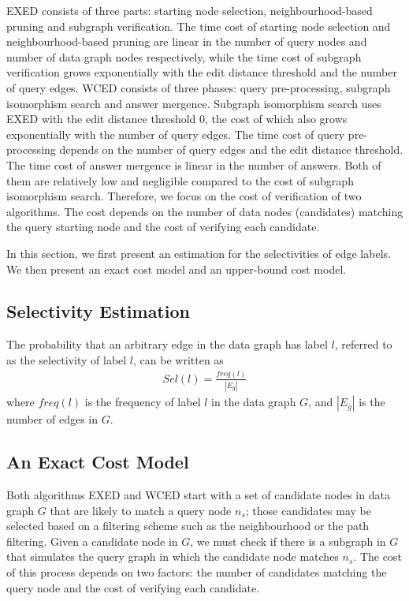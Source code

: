 \documentclass{sigmod}
\begin{document}
EXED consists of three parts: starting node selection, neighbourhood-based pruning and subgraph verification.  The time cost of starting node selection and  neighbourhood-based pruning are linear in the number of query nodes and number of data graph nodes respectively, while the time cost of subgraph verification grows exponentially with the edit distance threshold and the number of query edges. WCED consists of three phases: query pre-processing, subgraph isomorphism search and answer mergence. Subgraph isomorphism search uses EXED  with the edit distance threshold $0$, the cost of which also grows exponentially with the number of query edges. The time cost of query pre-processing depends on the number of query edges and the edit distance threshold. The time cost of  answer mergence is linear in the number of answers. Both of them are relatively low and negligible compared to the cost of subgraph isomorphism search. Therefore, we focus on the cost of  verification of two algorithms. The cost depends on the number of data nodes (candidates) matching the query starting node and the cost of verifying each candidate. 

In this section, we first present an estimation for the selectivities of edge labels. We then present an exact cost model and an upper-bound cost model. 

\subsection{Selectivity Estimation}
\label{sec:sel}
The probability that an arbitrary edge in the data graph has label $l$, referred to as the selectivity of label $l$, can be written as
\begin{align*}
Sel(l)  = \frac{freq(l)}{|E_g|}
\end{align*}
where $freq(l)$ is the frequency of label $l$ in the data graph $G$, and $|E_g|$ is the number of edges in $G$.
\subsection{An Exact Cost Model} 
Both algorithms EXED and WCED start with a set of candidate nodes in data graph $G$ that are likely to match a query node $n_s$; those candidates may be selected based on a filtering scheme such as the neighbourhood or the path filtering. 
Given a candidate node in $G$, we must check if there is a subgraph in $G$ that simulates the query graph in which the candidate node matches $n_s$. 
The cost of this process depends on two factors: the number of candidates matching the query node and the cost of verifying each candidate. 
\end{document}
